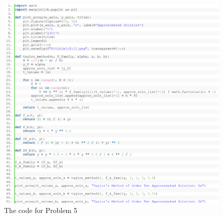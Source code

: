 \documentclass[11pt]{article}
\theoremstyle{break}
\numberwithin{equation}{theorem}
\begin{document}
\begin{center}
    \includegraphics[width=0.85\textwidth]{P5.png}\\
    The code for Problem 5
\end{center}
\end{document}
